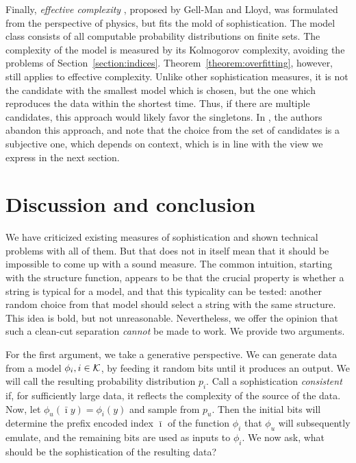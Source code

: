 Finally, \emph{effective complexity} \cite{gellmann1996information}, proposed by Gell-Man and Lloyd, was formulated from the perspective of physics, but fits the mold of sophistication. The model class consists of all computable probability distributions on finite sets. The complexity of the model is measured by its Kolmogorov complexity, avoiding the problems of Section~\ref{section:indices}. Theorem~\ref{theorem:overfitting}, however, still applies to effective complexity. Unlike other sophistication measures, it is not the candidate with the smallest model which is chosen, but the one which reproduces the data within the shortest time. Thus, if there are multiple candidates, this approach would likely favor the singletons. In \cite{gell2004nonextensive}, the authors abandon this approach, and note that the choice from the set of candidates is a subjective one, which depends on context, which is in line with the view we express in the next section.


\section{Discussion and conclusion}
\label{section:conclusion} 

We have criticized existing measures of sophistication and shown technical problems with all of them. But that does not in itself mean that it should be impossible to come up with a sound measure. The common intuition, starting with the structure function, appears to be that the crucial property is whether a string is typical for a model, and that this typicality can be tested: another random choice from that model should select a string with the same structure. This idea is bold, but not  unreasonable. Nevertheless, we offer the opinion that such a clean-cut separation \emph{cannot} be made to work. We provide two arguments.

For the first argument, we take a generative perspective. We can generate data from a model $\phi_i, i \in {\cal K}$, by feeding it random bits until it produces an output. We will call the resulting probability distribution $p_i$. Call a sophistication \emph{consistent} if, for sufficiently large data, it reflects the complexity of the source of the data. Now, let $\phi_u(\bar\imath y)=\phi_i(y)$ and sample from $p_u$. Then the initial bits will determine the prefix encoded index $\bar\imath$ of the function $\phi_i$ that $\phi_u$ will subsequently emulate, and the remaining bits are used as inputs to $\phi_i$. We now ask, what should be the sophistication of the resulting data? 
 
